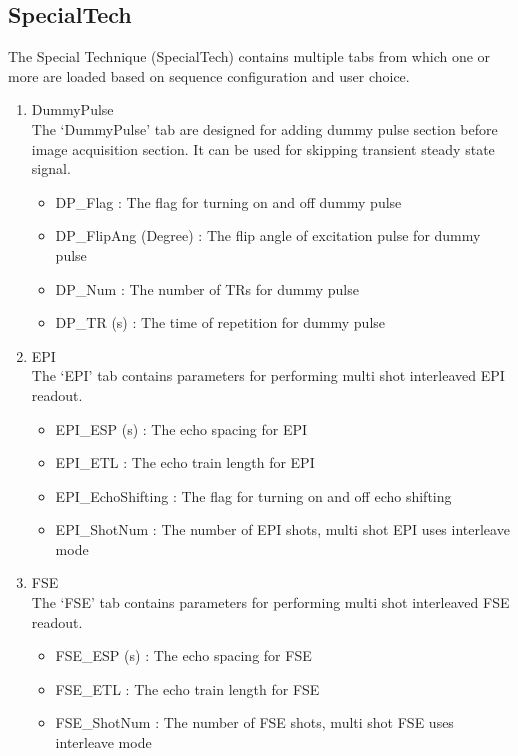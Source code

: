 \documentclass{book}%
\begin{document}
\subsection{SpecialTech}

The Special Technique (SpecialTech) contains multiple tabs from which one or more are loaded based on sequence configuration and user choice.

\begin{enumerate}
	\item DummyPulse \\
	The `DummyPulse' tab are designed for adding dummy pulse section before image acquisition section. It can be used for skipping transient steady state signal.
		\begin{itemize}
			\item DP\_Flag : The flag for turning on and off dummy pulse
			\item DP\_FlipAng (Degree) : The flip angle of excitation pulse for dummy pulse
			\item DP\_Num : The number of TRs for dummy pulse
			\item DP\_TR (s) : The time of repetition for dummy pulse
		\end{itemize}
	
  \item	EPI \\
	The `EPI' tab contains parameters for performing multi shot interleaved EPI readout.
		\begin{itemize}
			\item EPI\_ESP (s) : The echo spacing for EPI
			\item EPI\_ETL : The echo train length for EPI
			\item EPI\_EchoShifting : The flag for turning on and off echo shifting
			\item EPI\_ShotNum : The number of EPI shots, multi shot EPI uses interleave mode
		\end{itemize}
		
	\item FSE \\
	The `FSE' tab contains parameters for performing multi shot interleaved FSE readout.
		\begin{itemize}
			\item FSE\_ESP (s) : The echo spacing for FSE
			\item FSE\_ETL : The echo train length for FSE
			\item FSE\_ShotNum : The number of FSE shots, multi shot FSE uses interleave mode
		\end{itemize}
		

\end{enumerate}
\end{document}
